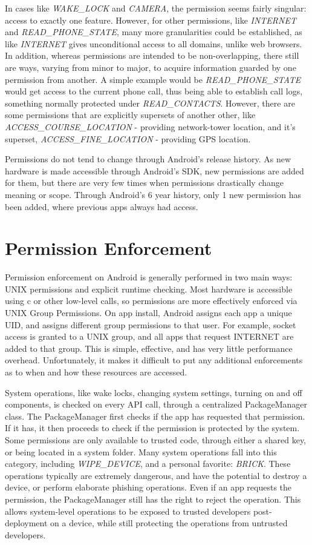 In cases like \textit{WAKE\_LOCK} and \textit{CAMERA}, the permission seems fairly singular: access to exactly one feature. However, for other permissions, like \textit{INTERNET} and \textit{READ\_PHONE\_STATE}, many more granularities could be established, as like \textit{INTERNET} gives unconditional access to all domains, unlike web browsers. In addition, whereas permissions are intended to be non-overlapping, there still are ways, varying from minor to major, to acquire information guarded by one permission from another. A simple example would be \textit{READ\_PHONE\_STATE} would get access to the current phone call, thus being able to establish call logs, something normally protected under \textit{READ\_CONTACTS}. However, there are some permissions that are explicitly supersets of another other, like \textit{ACCESS\_COURSE\_LOCATION} - providing network-tower location, and it's superset, \textit{ACCESS\_FINE\_LOCATION} - providing GPS location. 

Permissions do not tend to change through Android's release history. As new hardware is made accessible through Android's SDK, new permissions are added for them, but there are very few times when permissions drastically change meaning or scope. Through Android's 6 year history, only 1 new permission has been added, where previous apps always had access.

\section{Permission Enforcement}
Permission enforcement on Android is generally performed in two main ways: UNIX permissions and explicit runtime checking. Most hardware is accessible using c or other low-level calls, so permissions are more effectively enforced via UNIX Group Permissions. On app install, Android assigns each app a unique UID, and assigns different group permissions to that user. For example, socket access is granted to a UNIX group, and all apps that request INTERNET are added to that group. This is simple, effective, and has very little performance overhead. Unfortunately, it makes it difficult to put any additional enforcements as to when and how these resources are accessed. 

System operations, like wake locks, changing system settings, turning on and off components, is checked on every API call, through a centralized PackageManager class. The PackageManager first checks if the app has requested that permission. If it has, it then proceeds to check if the permission is protected by the system. Some permissions are only available to trusted code, through either a shared key, or being located in a system folder. Many system operations fall into this category, including \textit{WIPE\_DEVICE}, and a personal favorite: \textit{BRICK}. These operations typically are extremely dangerous, and have the potential to destroy a device, or perform elaborate phishing operations. Even if an app requests the permission, the PackageManager still has the right to reject the operation. This allows system-level operations to be exposed to trusted developers post-deployment on a device, while still protecting the operations from untrusted developers.

